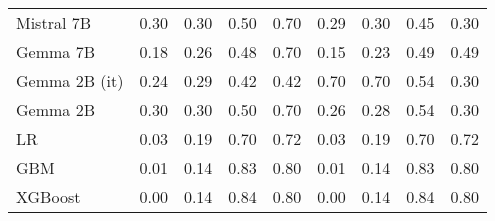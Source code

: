 \begin{tabular}{lllllllll}
Mistral 7B & \cellcolor{orange!22.1} 0.30 & \cellcolor{orange!18.5} 0.30 & 0.50 & 0.70 & 0.29 & 0.30 & \cellcolor{orange!25.0} 0.45 & \cellcolor{orange!25.0} 0.30 \\
Gemma 7B & 0.18 & 0.26 & 0.48 & 0.70 & 0.15 & \cellcolor{cyan!3.4} 0.23 & 0.49 & 0.49 \\
Gemma 2B (it) & 0.24 & \cellcolor{orange!14.2} 0.29 & \cellcolor{orange!25.0} 0.42 & 0.42 & \cellcolor{orange!25.0} 0.70 & \cellcolor{orange!25.0} 0.70 & 0.54 & \cellcolor{orange!25.0} 0.30 \\
Gemma 2B & \cellcolor{orange!25.0} 0.30 & \cellcolor{orange!25.0} 0.30 & 0.50 & 0.70 & 0.26 & 0.28 & 0.54 & \cellcolor{orange!25.0} 0.30 \\
LR & 0.03 & 0.19 & 0.70 & 0.72 & 0.03 & 0.19 & 0.70 & 0.72 \\
GBM & 0.01 & 0.14 & 0.83 & 0.80 & 0.01 & 0.14 & 0.83 & 0.80 \\
XGBoost & 0.00 & 0.14 & 0.84 & 0.80 & 0.00 & 0.14 & 0.84 & 0.80 \\
\bottomrule
\end{tabular}


